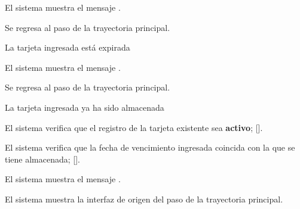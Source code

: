 {\begin{trayectoriaAlternativa}
    \item El sistema muestra el mensaje
      .

    \item Se regresa al paso  de la trayectoria
      principal.

  \end{trayectoriaAlternativa}


  \begin{trayectoriaAlternativa}
    {La tarjeta ingresada está expirada}

    \item El sistema muestra el mensaje
      .

    \item Se regresa al paso  de la trayectoria
      principal.

  \end{trayectoriaAlternativa}


  \begin{trayectoriaAlternativa}
    {La tarjeta ingresada ya ha sido almacenada}

    \item El sistema verifica que el registro de la tarjeta existente sea
      \textbf{activo}; [].

    \item El sistema verifica que la fecha de vencimiento ingresada coincida
      con la que se tiene almacenada;
      [].

    \item El sistema muestra el mensaje
      .

    \item El sistema muestra la interfaz de origen del paso
       de la trayectoria principal.

  \end{trayectoriaAlternativa}


}

